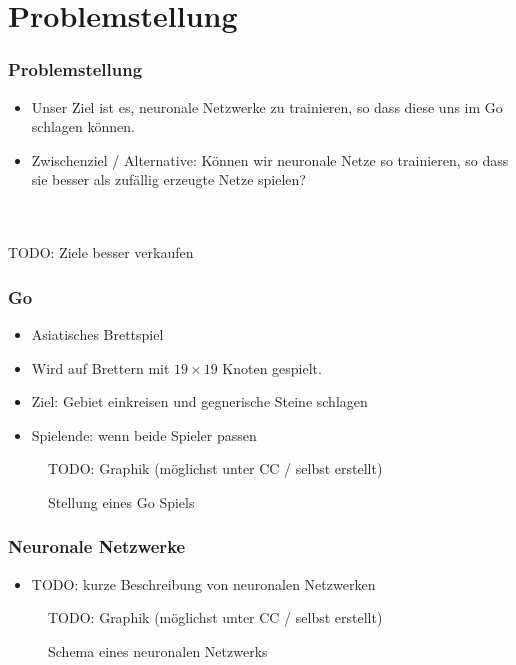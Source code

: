 \section{Problemstellung}

\begin{frame}
    \frametitle{Problemstellung}
    \begin{itemize}
        \item
            Unser Ziel ist es, neuronale Netzwerke zu trainieren, so dass diese
            uns im Go schlagen können.

        \item Zwischenziel / Alternative:
            Können wir neuronale Netze so trainieren, so dass sie besser als
            zufällig erzeugte Netze spielen?
    \end{itemize}

    \hfill \\
    \hfill \\
    TODO: Ziele besser verkaufen
\end{frame}

\begin{frame}
    \frametitle{Go}
    \begin{itemize}
        \item Asiatisches Brettspiel
        \item Wird auf Brettern mit $19 \times 19$ Knoten gespielt.
        \item Ziel: Gebiet einkreisen und gegnerische Steine schlagen
        \item Spielende: wenn beide Spieler passen
    \end{itemize}
    \begin{figure}
        TODO: Graphik (möglichst unter CC / selbst erstellt)
        \caption{Stellung eines Go Spiels}
    \end{figure}
\end{frame}

\begin{frame}
    \frametitle{Neuronale Netzwerke}
    \begin{itemize}
        \item TODO: kurze Beschreibung von neuronalen Netzwerken
    \end{itemize}
    \begin{figure}
        TODO: Graphik (möglichst unter CC / selbst erstellt)
        \caption{Schema eines neuronalen Netzwerks}
    \end{figure}
\end{frame}
